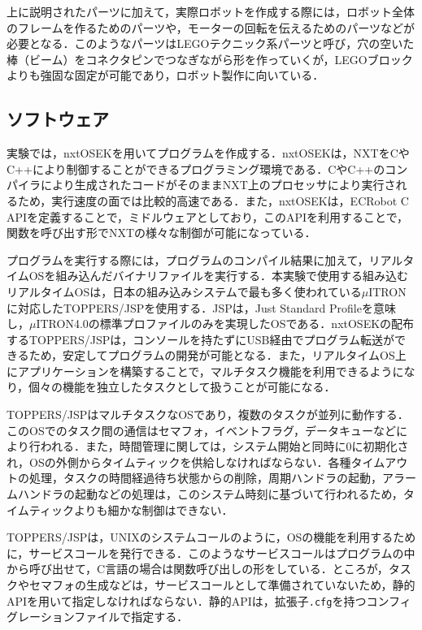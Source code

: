 \begin{multicols*}{2}
上に説明されたパーツに加えて，実際ロボットを作成する際には，ロボット全体のフレームを作るためのパーツや，モーターの回転を伝えるためのパーツなどが必要となる．このようなパーツはLEGOテクニック系パーツと呼び，穴の空いた棒（ビーム）をコネクタピンでつなぎながら形を作っていくが，LEGOブロックよりも強固な固定が可能であり，ロボット製作に向いている．

\subsection{ソフトウェア}
実験では，nxtOSEKを用いてプログラムを作成する．nxtOSEKは，NXTをCやC++により制御することができるプログラミング環境である．CやC++のコンパイラにより生成されたコードがそのままNXT上のプロセッサにより実行されるため，実行速度の面では比較的高速である．また，nxtOSEKは，ECRobot C APIを定義することで，ミドルウェアとしており，このAPIを利用することで，関数を呼び出す形でNXTの様々な制御が可能になっている．

プログラムを実行する際には，プログラムのコンパイル結果に加えて，リアルタイムOSを組み込んだバイナリファイルを実行する．本実験で使用する組み込むリアルタイムOSは，日本の組み込みシステムで最も多く使われている$\mu$ITRONに対応したTOPPERS/JSPを使用する．JSPは，Just Standard Profileを意味し，$\mu$ITRON4.0の標準プロファイルのみを実現したOSである．nxtOSEKの配布するTOPPERS/JSPは，コンソールを持たずにUSB経由でプログラム転送ができるため，安定してプログラムの開発が可能となる．また，リアルタイムOS上にアプリケーションを構築することで，マルチタスク機能を利用できるようになり，個々の機能を独立したタスクとして扱うことが可能になる．

TOPPERS/JSPはマルチタスクなOSであり，複数のタスクが並列に動作する．このOSでのタスク間の通信はセマフォ，イベントフラグ，データキューなどにより行われる．また，時間管理に関しては，システム開始と同時に0に初期化され，OSの外側からタイムティックを供給しなければならない．各種タイムアウトの処理，タスクの時間経過待ち状態からの削除，周期ハンドラの起動，アラームハンドラの起動などの処理は，このシステム時刻に基づいて行われるため，タイムティックよりも細かな制御はできない．

TOPPERS/JSPは，UNIXのシステムコールのように，OSの機能を利用するために，サービスコールを発行できる．このようなサービスコールはプログラムの中から呼び出せて，C言語の場合は関数呼び出しの形をしている．ところが，タスクやセマフォの生成などは，サービスコールとして準備されていないため，静的APIを用いて指定しなければならない．静的APIは，拡張子\texttt{.cfg}を持つコンフィグレーションファイルで指定する．


\end{multicols*}
